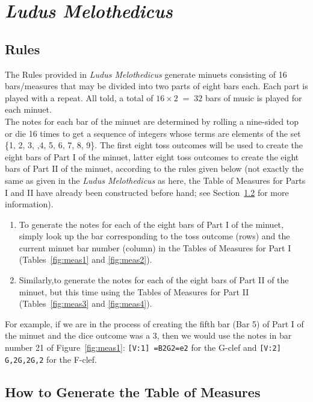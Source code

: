 \documentclass[a4paper,x11names,svgnames,10pt]{article}
\begin{document}
{\section{\em Ludus Melothedicus}

\subsection{Rules}\label{mdgRules}

The Rules provided in {\it Ludus Melothedicus} generate minuets consisting of 16 bars/measures that may be divided into two parts of eight bars each. Each part is played with a repeat. All told, a total of $16 \times 2 \;=\; 32$ bars of music is played for each minuet. \\

The notes for each bar of the minuet are determined by rolling a nine-sided top or die 16 times to get a sequence of integers whose terms are elements of the set \{1, 2, 3, ,4, 5, 6, 7, 8, 9\}. The first eight toss outcomes will be used to create the eight bars of Part I of the minuet, latter eight toss outcomes to create the eight bars of Part II of the minuet, according to the rules given below (not exactly the same as given in the {\em Ludus Melothedicus} as here, the Table of Measures for Parts I and II have already been constructed before hand; see Section~\ref*{genMeas} for more information). 

\begin{enumerate}
	\item [1.\label{step1}] To generate the notes for each of the eight bars of Part I of the minuet, simply look up the bar corresponding to the toss outcome (rows) and the current minuet bar number (column) in the Tables of Measures for Part I (Tables~\ref{fig:meas1} and \ref{fig:meas2}).  
	
	\item [2.\label{step2}] Similarly,to generate the notes for each of the eight bars of Part II of the minuet, but this time using the Tables of Measures for Part II (Tables~\ref{fig:meas3} and \ref{fig:meas4}). 
\end{enumerate}   

For example, if we are in the process of creating the fifth bar (Bar 5) of Part I of the minuet and the dice outcome was a 3, then we would use the notes in bar number 21 of Figure~\ref{fig:meas1}: {\tt [V:1] =B2G2=e2} for the G-clef and {\tt [V:2] G,2G,2G,2} for the F-clef. 


\subsection{How to Generate the Table of Measures}\label{genMeas}

}
\end{document}
